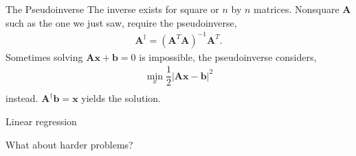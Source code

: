 \documentclass[notes]{beamer}
\begin{document}
    \begin{frame}{The Pseudoinverse \cite{strang2009introduction,deisenroth2020mathematics}}
      The inverse exists for square or $n$ by $n$ matrices.
      Nonsquare $\mathbf{A}$ such as the one we just saw, require the pseudoinverse,
        \begin{align}
          \mathbf{A}^{\dagger} = (\mathbf{A}^T\mathbf{A})^{-1}\mathbf{A}^T .
        \end{align}
      Sometimes solving $\mathbf{A}\mathbf{x} + \mathbf{b} = 0$ is impossible,
      the pseudoinverse considers,
        \begin{align}
          \min_x \dfrac{1}{2}|\mathbf{A}\mathbf{x} - \mathbf{b}|^2 \\
        \end{align}
      instead. $\mathbf{A}^{\dagger} \mathbf{b} = \mathbf{x}$ yields the solution.

    \end{frame}

    \begin{frame}{Linear regression}
      \begin{figure}
        
      \end{figure}
    \end{frame}

    \begin{frame}{What about harder problems?}
      \begin{figure}
        
      \end{figure}
    \end{frame}
\end{document}
